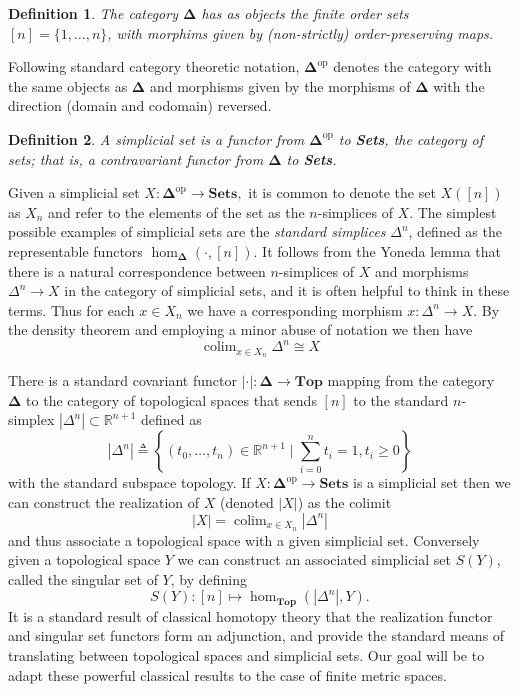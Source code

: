 \documentclass[12pt]{article}
\newtheorem{defn}{Definition}
\DeclareMathOperator*{\colim}{colim}
\begin{document}
\begin{defn}
The category $\boldsymbol{\Delta}$ has as objects the finite order sets $[n] = \{1, \ldots, n\}$, with morphims given by (non-strictly) order-preserving maps.
\end{defn}

Following standard category theoretic notation, $\boldsymbol{\Delta}^\text{op}$ denotes the category with the same objects as $\boldsymbol{\Delta}$ and morphisms given by the morphisms of $\boldsymbol{\Delta}$ with the direction (domain and codomain) reversed.

\begin{defn}
A \emph{simplicial set} is a functor from $\boldsymbol{\Delta}^\text{op}$ to \emph{\textbf{Sets}}, the category of sets; that is, a contravariant functor from $\boldsymbol{\Delta}$ to \emph{\textbf{Sets}}.
\end{defn}

Given a simplicial set $X:\boldsymbol{\Delta}^\text{op} \to \mathbf{Sets},$ it is common to denote the set $X([n])$ as $X_n$ and refer to the elements of the set as the $n$-simplices of $X$. The simplest possible examples of simplicial sets are the \emph{standard simplices} $\Delta^n$, defined as the representable functors $\hom_{\boldsymbol{\Delta}}(\cdot, [n])$. It follows from the Yoneda lemma that there is a natural correspondence between $n$-simplices of $X$ and morphisms $\Delta^n\to X$ in the category of simplicial sets, and it is often helpful to think in these terms.  Thus for each $x\in X_n$ we have a corresponding morphism $x:\Delta^n \to X$. By the density theorem and employing a minor abuse of notation we then have
\[
\colim_{x\in X_n} \Delta^n \cong X
\]

There is a standard covariant functor $|\cdot|: \boldsymbol{\Delta} \to \mathbf{Top}$ mapping from the category $\boldsymbol{\Delta}$ to the category of topological spaces that sends $[n]$ to the standard $n$-simplex $|\Delta^n| \subset \mathbb{R}^{n+1}$ defined as
\[
|\Delta^n| \triangleq \left\{(t_0, \ldots, t_n)\in \mathbb{R}^{n+1}\mid \sum_{i=0}^n t_i = 1, t_i \geq 0\right\}
\]
with the standard subspace topology.
If $X:\boldsymbol{\Delta}^\text{op} \to \mathbf{Sets}$ is a simplicial set then we can construct the realization of $X$ (denoted $|X|$) as the colimit
\[
|X| = \colim_{x\in X_n} |\Delta^n|
\]
and thus associate a topological space with a given simplicial set. Conversely given a topological space $Y$ we can construct an associated simplicial set $S(Y)$, called the singular set of $Y$, by defining 
\[
S(Y):[n]\mapsto \hom_{\mathbf{Top}}(|\Delta^n|,Y).
\]
It is a standard result of classical homotopy theory that the realization functor and singular set functors form an adjunction, and provide the standard means of translating between topological spaces and simplicial sets. Our goal will be to adapt these powerful classical results to the case of finite metric spaces.
\end{document}
